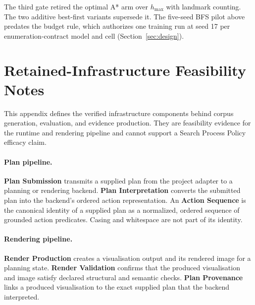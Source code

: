 The third gate retired the optimal A* arm over $h_{\max}$ with landmark counting. The two additive best-first variants supersede it. The five-seed BFS pilot above predates the budget rule, which authorizes one training run at seed 17 per enumeration-contract model and cell (Section~\ref{sec:design}).

\section{Retained-Infrastructure Feasibility Notes}

This appendix defines the verified infrastructure components behind corpus generation, evaluation, and evidence production. They are feasibility evidence for the runtime and rendering pipeline and cannot support a Search Process Policy efficacy claim.

\paragraph{Plan pipeline.}
\textbf{Plan Submission} transmits a supplied plan from the project adapter to a planning or rendering backend. \textbf{Plan Interpretation} converts the submitted plan into the backend's ordered action representation. An \textbf{Action Sequence} is the canonical identity of a supplied plan as a normalized, ordered sequence of grounded action predicates. Casing and whitespace are not part of its identity.

\paragraph{Rendering pipeline.}
\textbf{Render Production} creates a visualisation output and its rendered image for a planning state. \textbf{Render Validation} confirms that the produced visualisation and image satisfy declared structural and semantic checks. \textbf{Plan Provenance} links a produced visualisation to the exact supplied plan that the backend interpreted.

